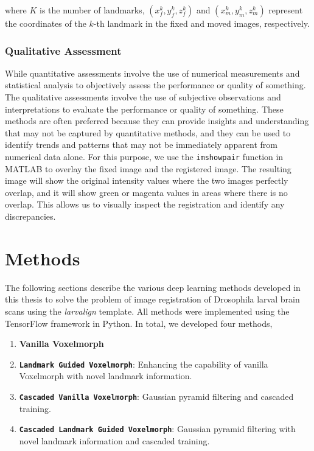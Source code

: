 \documentclass{book}
\begin{document}
	where $K$ is the number of landmarks, $(x_f^k, y_f^k, z_f^k)$ and $(x_m^k, y_m^k, z_m^k)$ represent the coordinates of the $k$-th landmark in the fixed and moved images, respectively.
	
	\subsection{Qualitative Assessment}
	While quantitative assessments involve the use of numerical measurements and statistical analysis to objectively assess the performance or quality of something. The qualitative assessments involve the use of subjective observations and interpretations to evaluate the performance or quality of something. These methods are often preferred because they can provide insights and understanding that may not be captured by quantitative methods, and they can be used to identify trends and patterns that may not be immediately apparent from numerical data alone.
	For this purpose, we use the \texttt{imshowpair} function in MATLAB to overlay the fixed image and the registered image. The resulting image will show the original intensity values where the two images perfectly overlap, and it will show green or magenta values in areas where there is no overlap. This allows us to visually inspect the registration and identify any discrepancies.
	
	\chapter{Methods}\label{chap:methods}
	
	The following sections describe the various deep learning methods developed in this thesis to solve the problem of image registration of Drosophila larval brain scans using the \textit{larvalign} template. All methods were implemented using the TensorFlow framework in Python. In total, we developed four methods,
	\begin{enumerate}
		\item \textbf{Vanilla Voxelmorph}
		\item \textbf{\texttt{Landmark Guided Voxelmorph}}: Enhancing the capability of vanilla Voxelmorph with novel landmark information.
		\item \textbf{\texttt{Cascaded Vanilla Voxelmorph}}: Gaussian pyramid filtering and cascaded training.
		\item \textbf{\texttt{Cascaded Landmark Guided Voxelmorph}}: Gaussian pyramid filtering with novel landmark information and cascaded training.
	\end{enumerate}
\end{document}
